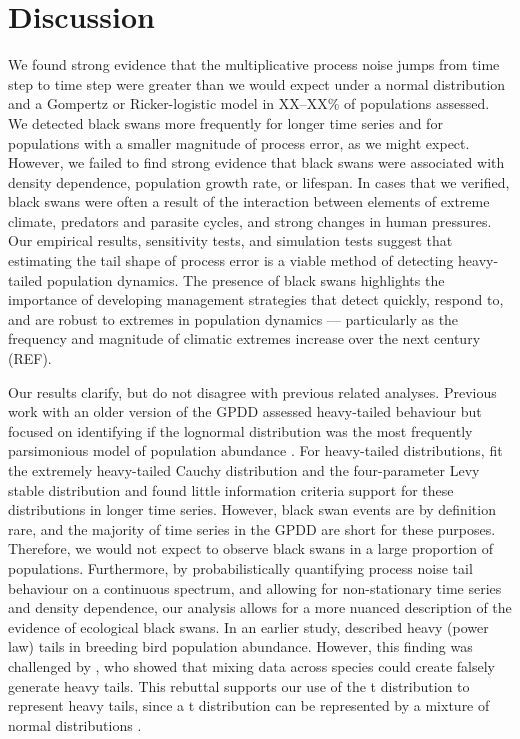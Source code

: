 \section{Discussion}

We found strong evidence that the multiplicative process noise jumps from time step to time step were greater than we would expect under a normal distribution and a Gompertz or Ricker-logistic model in XX--XX\% of populations assessed. We detected black swans more frequently for longer time series and for populations with a smaller magnitude of process error, as we might expect. However, we failed to find strong evidence that black swans were associated with density dependence, population growth rate, or lifespan. In cases that we verified, black swans were often a result of the interaction between elements of extreme climate, predators and parasite cycles, and strong changes in human pressures. Our empirical results, sensitivity tests, and simulation tests suggest that estimating the tail shape of process error is a viable method of detecting heavy-tailed population dynamics. The presence of black swans highlights the importance of developing management strategies that detect quickly, respond to, and are robust to extremes in population dynamics --- particularly as the frequency and magnitude of climatic extremes increase over the next century (REF).

Our results clarify, but do not disagree with previous related analyses. Previous work with an older version of the GPDD assessed heavy-tailed behaviour but focused on identifying if the lognormal distribution was the most frequently parsimonious model of population abundance \citep{halley2002}. For heavy-tailed distributions, \citet{halley2002} fit the extremely heavy-tailed Cauchy distribution and the four-parameter Levy stable distribution and found little information criteria support for these distributions in longer time series. However, black swan events are by definition rare, and the majority of time series in the GPDD are short for these purposes. Therefore, we would not expect to observe black swans in a large proportion of populations. Furthermore, by probabilistically quantifying process noise tail behaviour on a continuous spectrum, and allowing for non-stationary time series and density dependence, our analysis allows for a more nuanced description of the evidence of ecological black swans. In an earlier study, \citet{keitt1998} described heavy (power law) tails in breeding bird population abundance. However, this finding was challenged by \citet{allen2001}, who showed that mixing data across species could create falsely generate heavy tails. This rebuttal supports our use of the t distribution to represent heavy tails, since a t distribution can be represented by a mixture of normal distributions \citep[with inverse-gamma-distributed variances,][]{gelman2014}.

